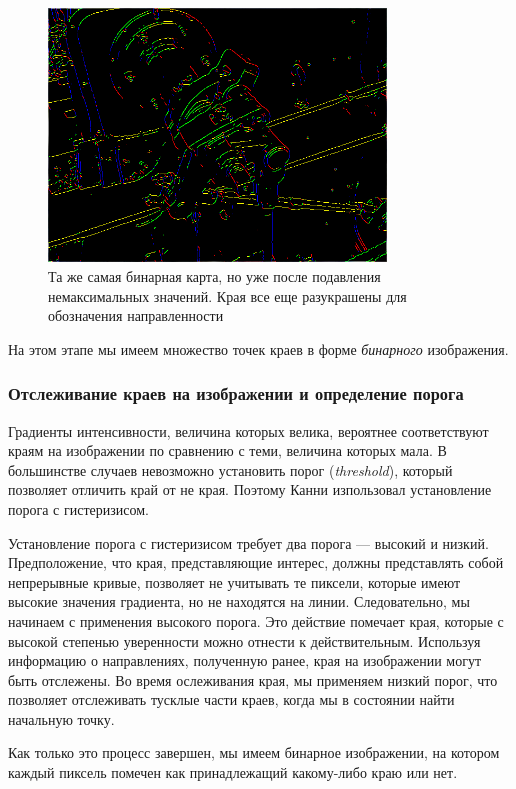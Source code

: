 \begin{figure}
  \centering
  \includegraphics[width=0.8\textwidth]{images/canny-suppression.png}
  \caption{Та же самая бинарная карта, но уже после подавления немаксимальных значений. Края все еще разукрашены для обозначения направленности\label{canny-suppression}}
\end{figure}

На этом этапе мы имеем множество точек краев в форме \emph{бинарного} изображения.

\subsubsection{Отслеживание краев на изображении и определение порога}
Градиенты интенсивности, величина которых велика, вероятнее соответствуют краям на изображении по сравнению с теми, величина которых мала. В большинстве случаев невозможно установить порог (\emph{threshold}), который позволяет отличить край от не края. Поэтому Канни изпользовал установление порога с гистеризисом.

Установление порога с гистеризисом требует два порога --- высокий и низкий. Предположение, что края, представляющие интерес, должны представлять собой непрерывные кривые, позволяет не учитывать те пиксели, которые имеют высокие значения градиента, но не находятся на линии. Следовательно, мы начинаем с применения высокого порога. Это действие помечает края, которые с высокой степенью уверенности можно отнести к действительным. Используя информацию о направлениях, полученную ранее, края на изображении могут быть отслежены. Во время ослеживания края, мы применяем низкий порог, что позволяет отслеживать тусклые части краев, когда мы в состоянии найти начальную точку.

Как только это процесс завершен, мы имеем бинарное изображении, на котором каждый пиксель помечен как принадлежащий какому-либо краю или нет.

